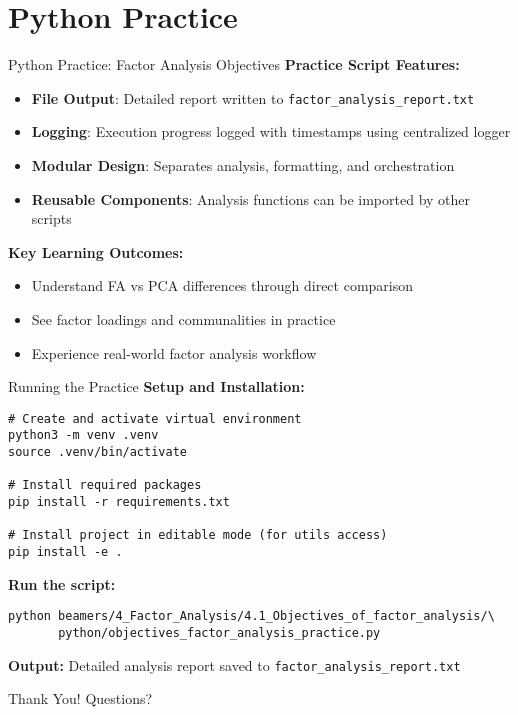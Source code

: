 \documentclass[aspectratio=169]{beamer}
\begin{document}
\section{Python Practice}
\begin{frame}{Python Practice: Factor Analysis Objectives}
  \textbf{Practice Script Features:}
  \begin{itemize}
    \item \textbf{File Output}: Detailed report written to \texttt{factor\_analysis\_report.txt}
    \item \textbf{Logging}: Execution progress logged with timestamps using centralized logger
    \item \textbf{Modular Design}: Separates analysis, formatting, and orchestration
    \item \textbf{Reusable Components}: Analysis functions can be imported by other scripts
  \end{itemize}
  
  \vspace{0.5cm}
  \textbf{Key Learning Outcomes:}
  \begin{itemize}
    \item Understand FA vs PCA differences through direct comparison  
    \item See factor loadings and communalities in practice
    \item Experience real-world factor analysis workflow
  \end{itemize}
\end{frame}

\begin{frame}[fragile]{Running the Practice}
  \textbf{Setup and Installation:}
  \begin{verbatim}
# Create and activate virtual environment
python3 -m venv .venv
source .venv/bin/activate

# Install required packages  
pip install -r requirements.txt

# Install project in editable mode (for utils access)
pip install -e .
  \end{verbatim}
  
  \vspace{0.3cm}
  \textbf{Run the script:}
  \begin{verbatim}
python beamers/4_Factor_Analysis/4.1_Objectives_of_factor_analysis/\
       python/objectives_factor_analysis_practice.py
  \end{verbatim}
  
  \vspace{0.3cm}
  \textbf{Output:} Detailed analysis report saved to \texttt{factor\_analysis\_report.txt}
\end{frame}

\begin{frame}
  \centering
  \Huge Thank You!
  \vspace{1cm}
  \normalsize Questions?
\end{frame}
\end{document}
